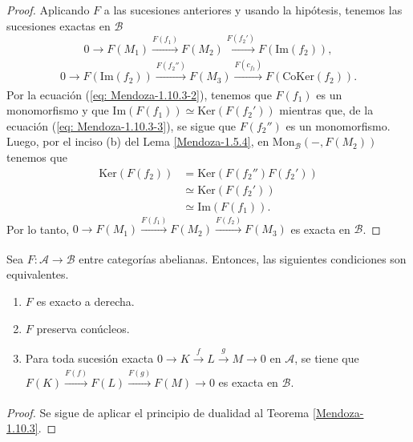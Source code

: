 \documentclass[tesis]{subfiles}
\begin{document}
\begin{proof}
    Aplicando $F$ a las sucesiones anteriores y usando la hipótesis, tenemos las sucesiones exactas en $\mathscr{B}$
    \begin{equation}\label{eq: Mendoza-1.10.3-2}
        0\to F(M_1)\xrightarrow[]{F(f_1)} F(M_2) \xrightarrow[]{F(f_2')} F(\text{Im}(f_2)),
    \end{equation}
    \begin{equation}\label{eq: Mendoza-1.10.3-3}
        0\to F(\text{Im}(f_2))\xrightarrow[]{F(f_2'')} F(M_3) \xrightarrow[]{F(c_{f_2})} F(\text{CoKer}(f_2)).
    \end{equation}
    Por la ecuación (\ref{eq: Mendoza-1.10.3-2}), tenemos que $F(f_1)$ es un monomorfismo y que $\text{Im}(F(f_1))\simeq\text{Ker}(F(f_2'))$ mientras que, de la ecuación (\ref{eq: Mendoza-1.10.3-3}), se sigue que $F(f_2'')$ es un monomorfismo. Luego, por el inciso (b) del Lema \ref{Mendoza-1.5.4}, en $\text{Mon}_\mathscr{B}(-,F(M_2))$ tenemos que
    \begin{align*}
        \text{Ker}(F(f_2)) &= \text{Ker}(F(f_2'')F(f_2')) \\
                           &\simeq \text{Ker}(F(f_2')) \\
                           &\simeq \text{Im}(F(f_1)).
    \end{align*}
    Por lo tanto, $0\to F(M_1)\xrightarrow[]{F(f_1)} F(M_2) \xrightarrow[]{F(f_2)} F(M_3)$ es exacta en $\mathscr{B}$.
\end{proof}

\begin{Teo}\label{Mendoza-Ejer.58}
    Sea $F:\mathscr{A}\to \mathscr{B}$ entre categorías abelianas. Entonces, las siguientes condiciones son equivalentes.

    \begin{enumerate}[label=(\alph*)]
    
        \item $F$ es exacto a derecha.

        \item $F$ preserva conúcleos.

        \item Para toda sucesión exacta $0\to K\xrightarrow[]{f} L\xrightarrow[]{g} M\to 0$ en $\mathscr{A}$, se tiene que $F(K)\xrightarrow[]{F(f)} F(L)\xrightarrow[]{F(g)} F(M)\to 0$ es exacta en $\mathscr{B}$.
    \end{enumerate}
\end{Teo}

\begin{proof}
    Se sigue de aplicar el principio de dualidad al Teorema \ref{Mendoza-1.10.3}.
\end{proof}
\end{document}
